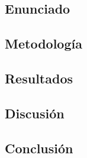 \documentclass{article}
\begin{document}
\subsection{Enunciado}

\subsection{Metodología}

\subsection{Resultados}
\setcounter{equation}{0}

\subsection{Discusión}

\subsection{Conclusión}
\end{document}
